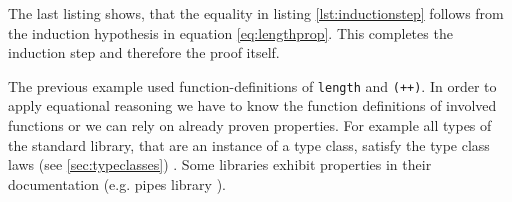 \begin{description}
The last listing shows, that the equality in listing \ref{lst:inductionstep} follows from the induction hypothesis in equation \ref{eq:lengthprop}. This completes the induction step and therefore the proof itself.
\end{description}

The previous example used \glspl{function-definition} of \verb|length| and \verb|(++)|. In order to apply equational reasoning we have to know the function definitions of involved functions or we can rely on already proven properties. 
For example all types of the standard library, that are an instance of a type class, satisfy the type class laws (see \ref{sec:typeclasses}) \cite{yorgey}. Some libraries exhibit properties in their documentation (e.g. pipes library \cite{gonzales13}). 